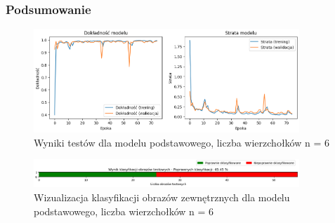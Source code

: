 \begin{frame}
    \frametitle{Podsumowanie}

    \begin{figure}[ht]
        \centering
        \includegraphics[width=10cm]{../thesis/resources/tests/images/v3/base6_img.png}
        \caption{Wyniki testów dla modelu podstawowego, liczba wierzchołków n = 6}
    \end{figure}

    \begin{figure}[ht]
        \centering
        \includegraphics[width=10cm]{../thesis/resources/tests/images/v3/base6_bar.png}
        \caption{Wizualizacja klasyfikacji obrazów zewnętrznych dla modelu podstawowego, liczba wierzchołków n = 6}
    \end{figure}

\end{frame}